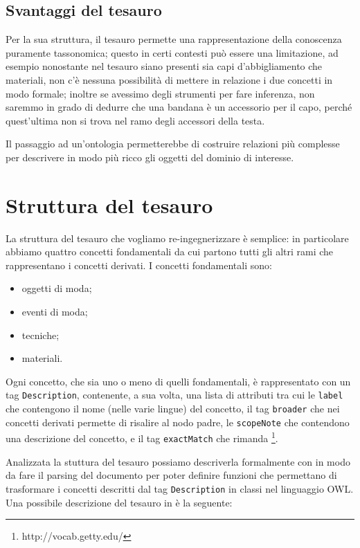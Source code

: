 \subsection{Svantaggi del tesauro}
Per la sua struttura, il tesauro permette una rappresentazione della conoscenza puramente tassonomica; questo in certi contesti può essere una limitazione, ad esempio nonostante nel tesauro siano presenti sia capi d'abbigliamento che materiali, non c'è nessuna possibilità di mettere in relazione i due concetti in modo formale; inoltre se avessimo degli strumenti per fare inferenza, non saremmo in grado di dedurre che una bandana è un accessorio per il capo, perché quest'ultima non si trova nel ramo degli accessori della testa.

Il passaggio ad un'ontologia permetterebbe di costruire relazioni più complesse per descrivere in modo più ricco gli oggetti del dominio di interesse.
\section{Struttura del tesauro}
La struttura del tesauro che vogliamo re-ingegnerizzare è semplice: in particolare abbiamo quattro concetti fondamentali da cui partono tutti gli altri rami che rappresentano i concetti derivati. I concetti fondamentali sono:
\begin{itemize}
	\item oggetti di moda;
	\item eventi di moda;
	\item tecniche;
	\item materiali.
\end{itemize}
Ogni concetto, che sia uno o meno di quelli fondamentali, è rappresentato con un tag \verb|Description|, contenente, a sua volta, una lista di attributi tra cui le \verb|label| che contengono il nome (nelle varie lingue) del concetto, il tag \verb|broader| che nei concetti derivati permette di risalire al nodo padre, le \verb|scopeNote| che contendono una descrizione del concetto, e il tag \verb|exactMatch| che rimanda \footnote{http://vocab.getty.edu/}.

Analizzata la stuttura del tesauro possiamo descriverla formalmente con \cduce in modo da fare il parsing del documento per poter definire funzioni che permettano di trasformare i concetti descritti dal tag \verb|Description| in classi nel linguaggio OWL. Una possibile descrizione del tesauro in \cduce è la seguente:
